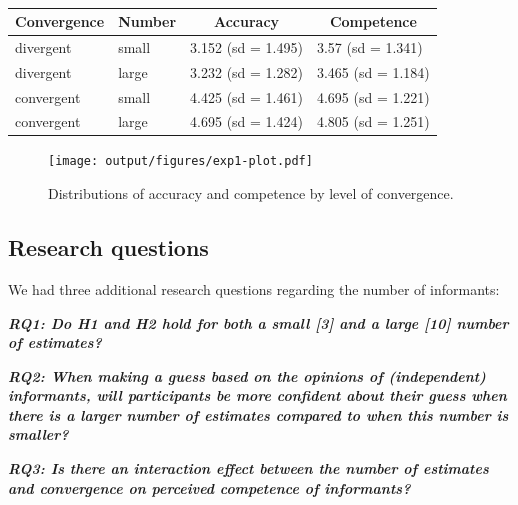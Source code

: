 \documentclass[
  doc,floatsintext]{apa6}
\begin{document}
\begin{table}[tbp]

\begin{center}
\begin{threeparttable}

\caption{\label{tab:exp1-table}}

\begin{tabular}{llll}
\toprule
Convergence & \multicolumn{1}{c}{Number} & \multicolumn{1}{c}{Accuracy} & \multicolumn{1}{c}{Competence}\\
\midrule
divergent & small & 3.152 (sd = 1.495) & 3.57 (sd = 1.341)\\
divergent & large & 3.232 (sd = 1.282) & 3.465 (sd = 1.184)\\
convergent & small & 4.425 (sd = 1.461) & 4.695 (sd = 1.221)\\
convergent & large & 4.695 (sd = 1.424) & 4.805 (sd = 1.251)\\
\bottomrule
\end{tabular}

\end{threeparttable}
\end{center}

\end{table}



\begin{figure}
\centering
\texttt{[image: output/figures/exp1-plot.pdf]}
\caption{\label{fig:exp1-plot}Distributions of accuracy and competence by level of convergence.}
\end{figure}

\subsection{Research questions}\label{research-questions}

We had three additional research questions regarding the number of informants:

\textbf{\emph{RQ1: Do H1 and H2 hold for both a small {[}3{]} and a large {[}10{]} number of estimates?}}

\textbf{\emph{RQ2: When making a guess based on the opinions of (independent) informants, will participants be more confident about their guess when there is a larger number of estimates compared to when this number is smaller?}}

\textbf{\emph{RQ3: Is there an interaction effect between the number of estimates and convergence on perceived competence of informants?}}
\end{document}
